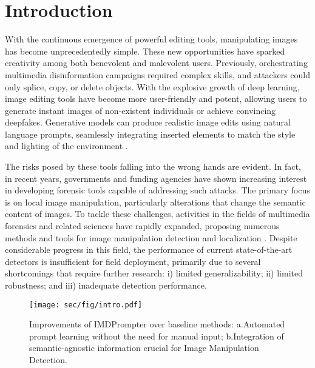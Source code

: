 \section{Introduction}\label{sec:intro}
With the continuous emergence of powerful editing tools, manipulating images has become unprecedentedly simple. These new opportunities have sparked creativity among both benevolent and malevolent users. Previously, orchestrating multimedia disinformation campaigns required complex skills, and attackers could only splice, copy, or delete objects. With the explosive growth of deep learning, image editing tools have become more user-friendly and potent, allowing users to generate instant images of non-existent individuals or achieve convincing deepfakes. Generative models can produce realistic image edits using natural language prompts, seamlessly integrating inserted elements to match the style and lighting of the environment \cite{avrahami2023blended, nichol2021glide}.

The risks posed by these tools falling into the wrong hands are evident. In fact, in recent years, governments and funding agencies have shown increasing interest in developing forensic tools capable of addressing such attacks. The primary focus is on local image manipulation, particularly alterations that change the semantic content of images. To tackle these challenges, activities in the fields of multimedia forensics and related sciences have rapidly expanded, proposing numerous methods and tools for image manipulation detection and localization \cite{verdoliva2020media,cozzolino2022data,huh2018fighting,wu2019mantra}. Despite considerable progress in this field, the performance of current state-of-the-art detectors is insufficient for field deployment, primarily due to several shortcomings that require further research: i) limited generalizability; ii) limited robustness; and iii) inadequate detection performance.
\begin{figure}[t]
	\centering
	\texttt{[image: sec/fig/intro.pdf]}
	\caption{Improvements of IMDPrompter over baseline methods: a.Automated prompt learning without the need for manual input; b.Integration of semantic-agnostic information crucial for Image Manipulation Detection.}
	\label{fig:intro}
\end{figure}

